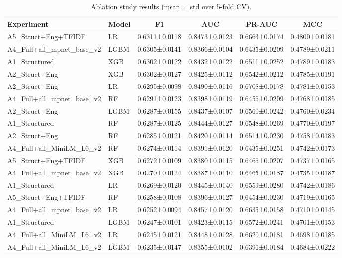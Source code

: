 \begin{table}
\caption{Ablation study results (mean ± std over 5-fold CV).}
\label{tab:ablation}
\begin{tabular}{llcccc}
\toprule
Experiment & Model & F1 & AUC & PR-AUC & MCC \\
\midrule
A5_Struct+Eng+TFIDF & LR & 0.6311±0.0118 & 0.8473±0.0123 & 0.6663±0.0174 & 0.4800±0.0181 \\
A4_Full+all_mpnet_base_v2 & LGBM & 0.6305±0.0141 & 0.8366±0.0104 & 0.6435±0.0209 & 0.4789±0.0211 \\
A1_Structured & XGB & 0.6302±0.0122 & 0.8432±0.0122 & 0.6511±0.0252 & 0.4789±0.0183 \\
A2_Struct+Eng & XGB & 0.6302±0.0127 & 0.8425±0.0112 & 0.6542±0.0212 & 0.4785±0.0191 \\
A2_Struct+Eng & LR & 0.6295±0.0098 & 0.8490±0.0116 & 0.6708±0.0178 & 0.4781±0.0153 \\
A4_Full+all_mpnet_base_v2 & RF & 0.6291±0.0123 & 0.8398±0.0119 & 0.6456±0.0209 & 0.4768±0.0185 \\
A2_Struct+Eng & LGBM & 0.6287±0.0155 & 0.8437±0.0107 & 0.6560±0.0242 & 0.4760±0.0234 \\
A1_Structured & RF & 0.6287±0.0125 & 0.8444±0.0127 & 0.6548±0.0269 & 0.4770±0.0197 \\
A2_Struct+Eng & RF & 0.6285±0.0121 & 0.8420±0.0114 & 0.6514±0.0230 & 0.4758±0.0183 \\
A4_Full+all_MiniLM_L6_v2 & RF & 0.6274±0.0114 & 0.8391±0.0120 & 0.6435±0.0251 & 0.4742±0.0173 \\
A5_Struct+Eng+TFIDF & XGB & 0.6272±0.0109 & 0.8380±0.0115 & 0.6466±0.0207 & 0.4737±0.0165 \\
A4_Full+all_mpnet_base_v2 & XGB & 0.6270±0.0124 & 0.8387±0.0110 & 0.6465±0.0187 & 0.4735±0.0187 \\
A1_Structured & LR & 0.6269±0.0120 & 0.8445±0.0140 & 0.6559±0.0280 & 0.4742±0.0186 \\
A5_Struct+Eng+TFIDF & RF & 0.6258±0.0108 & 0.8396±0.0127 & 0.6454±0.0230 & 0.4719±0.0165 \\
A4_Full+all_mpnet_base_v2 & LR & 0.6252±0.0094 & 0.8457±0.0120 & 0.6635±0.0158 & 0.4710±0.0145 \\
A1_Structured & LGBM & 0.6247±0.0101 & 0.8423±0.0115 & 0.6572±0.0241 & 0.4701±0.0153 \\
A4_Full+all_MiniLM_L6_v2 & LR & 0.6245±0.0121 & 0.8448±0.0128 & 0.6620±0.0181 & 0.4698±0.0185 \\
A4_Full+all_MiniLM_L6_v2 & LGBM & 0.6235±0.0147 & 0.8355±0.0102 & 0.6396±0.0184 & 0.4684±0.0222 \\

\end{tabular}
\end{table}
